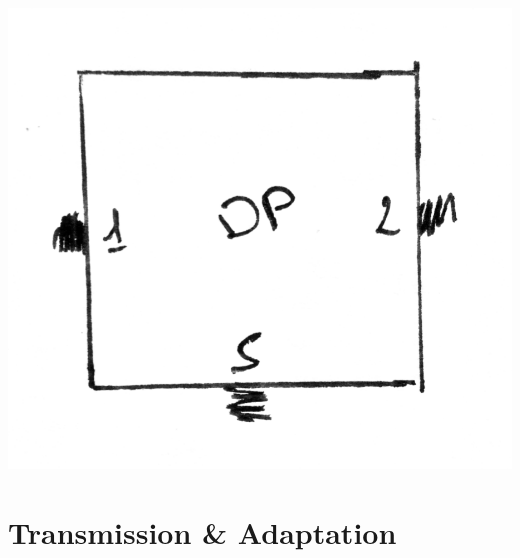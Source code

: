 \documentclass[a4paper,12pt]{report}            %
\begin{document}
\begin{center}\includegraphics[scale = 0.2]{pic/DP.png}\\ \end{center}

\section{Transmission \& Adaptation}
\end{document}
